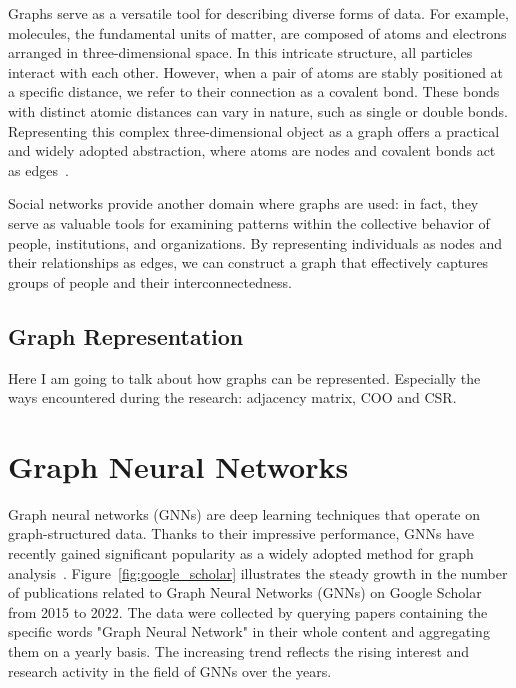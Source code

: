 Graphs serve as a versatile tool for describing diverse forms of data.
For example, molecules, the fundamental units of matter, are composed of atoms and electrons arranged in three-dimensional space.
In this intricate structure, all particles interact with each other.
However, when a pair of atoms are stably positioned at a specific distance, we refer to their connection as a covalent bond.
These bonds with distinct atomic distances can vary in nature, such as single or double bonds.
Representing this complex three-dimensional object as a graph offers a practical and widely adopted abstraction, where atoms are nodes and covalent bonds act as edges~\cite{DBLP:journals/corr/DuvenaudMAGHAA15}.

Social networks provide another domain where graphs are used: in fact, they serve as valuable tools for examining patterns within the collective behavior of people, institutions, and organizations.
By representing individuals as nodes and their relationships as edges, we can construct a graph that effectively captures groups of people and their interconnectedness.

\subsection{Graph Representation}
\label{subsec:graph_representation}

Here I am going to talk about how graphs can be represented.
Especially the ways encountered during the research: adjacency matrix, COO and CSR\@.


\section{Graph Neural Networks}
\label{sec:graph_neural_networks}%


Graph neural networks (GNNs) are deep learning techniques that operate on graph-structured data.
Thanks to their impressive performance, GNNs have recently gained significant popularity as a widely adopted method for graph analysis~\cite{KERAMATFAR2022100401}.
Figure~\ref{fig:google_scholar} illustrates the steady growth in the number of publications related to Graph Neural Networks (GNNs) on Google Scholar from 2015 to 2022.
The data were collected by querying papers containing the specific words "Graph Neural Network" in their whole content and aggregating them on a yearly basis.
The increasing trend reflects the rising interest and research activity in the field of GNNs over the years.

